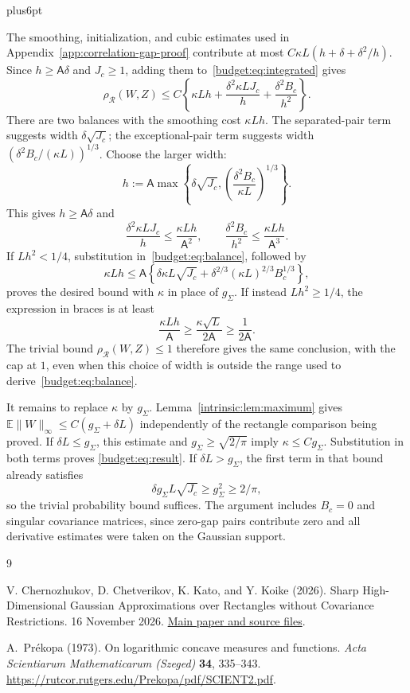 \documentclass[11pt,letterpaper,twoside,leqno]{article}
\makeatletter
\theoremstyle{bookplain}
\theoremstyle{bookremark}
\renewenvironment{proof}[1][\proofname]{\par
  \pushQED{\qed}\normalfont\topsep6pt plus6pt\relax
  \trivlist\item[\hskip\labelsep\bfseries #1\@addpunct{.}]\ignorespaces
}{\popQED\endtrivlist\@endpefalse}
\newcommand{\E}{\mathbb E}
\newcommand{\rh}{\rho_{\mathcal R}}
\makeatother
\begin{document}
\begin{proof}[Proof of Corollary~\ref{cor:correlation-budget}]
The smoothing, initialization, and cubic estimates used in
Appendix~\ref{app:correlation-gap-proof} contribute at most
$C\kappa L(h+\delta+\delta^2/h)$. Since $h\ge\mathsf A\delta$
and $J_c\ge1$, adding them to~\eqref{budget:eq:integrated} gives
\begin{equation}
 \rh(W,Z)\le C\left\{
       \kappa Lh+\frac{\delta^2\kappa LJ_c}{h}
                    +\frac{\delta^2B_c}{h^2}\right\}.
 \label{budget:eq:balance}
\end{equation}
There are two balances with the smoothing cost $\kappa Lh$.
The separated-pair term suggests width $\delta\sqrt{J_c}$;
the exceptional-pair term suggests width
$(\delta^2B_c/(\kappa L))^{1/3}$. Choose the larger width:
\[
 h:=\mathsf A\max\left\{\delta\sqrt{J_c},
                    \left(\frac{\delta^2B_c}{\kappa L}\right)^{1/3}
              \right\}.
\]
This gives $h\ge\mathsf A\delta$ and
\[
 \frac{\delta^2\kappa LJ_c}{h}
       \le\frac{\kappa Lh}{\mathsf A^2},\qquad
 \frac{\delta^2B_c}{h^2}
       \le\frac{\kappa Lh}{\mathsf A^3}.
\]
If $Lh^2<1/4$, substitution in~\eqref{budget:eq:balance}, followed by
\[
 \kappa Lh\le\mathsf A\left\{
       \delta\kappa L\sqrt{J_c}
       +\delta^{2/3}(\kappa L)^{2/3}B_c^{1/3}\right\},
\]
proves the desired bound with $\kappa$ in place of $g_\Sigma$.
If instead $Lh^2\ge1/4$, the expression in braces is at least
\[
 \frac{\kappa Lh}{\mathsf A}
 \ge\frac{\kappa\sqrt L}{2\mathsf A}
 \ge\frac1{2\mathsf A}.
\]
The trivial bound $\rh(W,Z)\le1$ therefore gives the same conclusion,
with the cap at $1$, even when this choice of width is outside the
range used to derive~\eqref{budget:eq:balance}.

It remains to replace $\kappa$ by $g_\Sigma$. Lemma~\ref{intrinsic:lem:maximum}
gives $\E\|W\|_\infty\le C(g_\Sigma+\delta L)$ independently of
the rectangle comparison being proved. If $\delta L\le g_\Sigma$,
this estimate and $g_\Sigma\ge\sqrt{2/\pi}$ imply
$\kappa\le Cg_\Sigma$. Substitution in both terms proves
\eqref{budget:eq:result}. If $\delta L>g_\Sigma$, the first term
in that bound already satisfies
\[
 \delta g_\Sigma L\sqrt{J_c}\ge g_\Sigma^2\ge2/\pi,
\]
so the trivial probability bound suffices. The argument includes
$B_c=0$ and singular covariance matrices, since zero-gap pairs
contribute zero and all derivative estimates were taken on the
Gaussian support.
\end{proof}
\clearpage
\begin{thebibliography}{9}
\setlength{\itemsep}{1pt}
\raggedright
{}
{}
V. Chernozhukov, D. Chetverikov, K. Kato, and Y. Koike (2026).
Sharp High-Dimensional Gaussian Approximations over Rectangles
without Covariance Restrictions.
16 November 2026.
\href{https://github.com/VC2015/rectangle-clt-singular/blob/main/research-rectangle-clt-singular/Rectangle_CLT_arXiv_2026-11-16.pdf}{Main paper and source files}.

A.~Pr\'ekopa (1973).
On logarithmic concave measures and functions.
\emph{Acta Scientiarum Mathematicarum (Szeged)} \textbf{34}, 335--343.
\url{https://rutcor.rutgers.edu/Prekopa/pdf/SCIENT2.pdf}.

\end{thebibliography}
\end{document}

